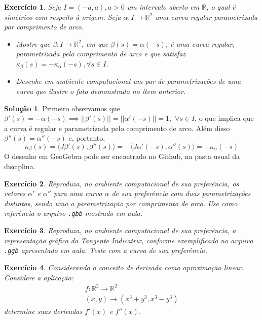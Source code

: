 \documentclass[a4paper,12pt]{article}
\newcommand{\R}{\mathbb{R}}
\theoremstyle{exer}
\newtheorem{exercise}{Exercício}
\theoremstyle{definition}
\newtheorem{solution}{Solução}
\theoremstyle{plain}
\begin{document}
\begin{exercise}
    Seja $I = (-a,a), a > 0$ um intervalo aberto em $\R$, o qual é simétrico
    com respeito à origem. Seja $\alpha : I \to \R^2$ uma curva regular
    parametrizada por comprimento de arco. 
    \begin{itemize}
        \item Mostre que $\beta : I \to \R^2$, em que $\beta(s) = \alpha(-s)$,
        é uma curva regular, parametrizada pelo comprimento de arco e que
        satisfaz $\kappa_{\beta}(s) = -\kappa_{\alpha}(-s), \forall s \in I$.
        \item Desenhe em ambiente computacional um par de parametrizações de
        uma curva que ilustre o fato demonstrado no item anterior.
    \end{itemize}
\end{exercise}

\begin{solution}
    Primeiro observamos que $\beta '(s) = -\alpha(-s) \implies ||\beta'(s)|| =
    ||\alpha '(-s)|| = 1,$ $\forall s \in I$, o que implica que a curva é
    regular e parametrizada pelo comprimento de arco. Além disso $\beta''(s) =
    \alpha''(-s)$ e, portanto, 
    $$
    \kappa_{\beta}(s) = \langle J\beta '(s), \beta''(s) \rangle = - \langle J\alpha'(-s), \alpha ''(s) \rangle = - \kappa_{\alpha}(-s) 
    $$
    O desenho em GeoGebra pode ser encontrado no Github, na pasta usual da
    disciplina. 
\end{solution}

\begin{exercise}
     Reproduza, no ambiente computacional de sua preferência, os vetores $\alpha'$ e $\alpha''$ para uma curva $\alpha$ de sua preferência com duas parametrizações distintas, sendo uma a parametrização por comprimento de arco. Use como referência o arquivo \texttt{.gbb} mostrado em aula.
\end{exercise}

\begin{exercise}
    Reproduza, no ambiente computacional de sua preferência, a representação gráfica da
    \textit{Tangente Indicatrix}, conforme exemplificado no arquivo \texttt{.ggb} apresentado em aula. Teste com a curva de sua preferência.
\end{exercise}

\begin{exercise}
    Considerando o conceito de derivada como aproximação linear. Considere a
    aplicação: 
    \begin{gather}
        f: \R^2 \to \R^2 \\
        (x,y) \to (x^3 + y^3, x^3 - y^3) 
    \end{gather}
    determine suas derivadas $f'(x)$ e $f''(x)$. 
\end{exercise}
\end{document}
